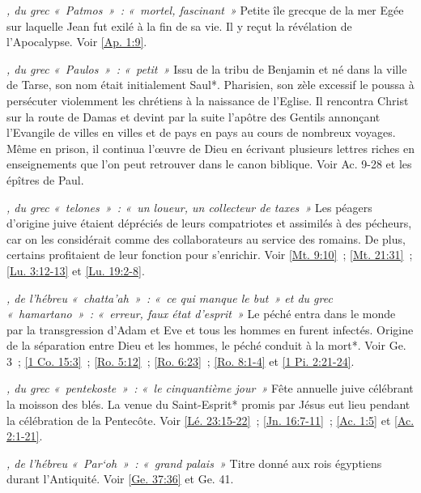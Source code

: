 \begin{multicols}{2}
\textit{, du grec «~Patmos~»~: «~mortel, fascinant~»}\newline
Petite île grecque de la mer Egée sur laquelle Jean fut exilé à la fin de sa vie. Il y reçut la révélation de l'Apocalypse. Voir \vref{Ap. 1:9}.

\textit{, du grec «~Paulos~»~: «~petit~»}\newline
Issu de la tribu de Benjamin et né dans la ville de Tarse, son nom était initialement Saul*. Pharisien, son zèle excessif le poussa à persécuter violemment les chrétiens à la naissance de l'Eglise. Il rencontra Christ sur la route de Damas et devint par la suite l'apôtre des Gentils annonçant l'Evangile de villes en villes et de pays en pays au cours de nombreux voyages. Même en prison, il continua l'œuvre de Dieu en écrivant plusieurs lettres riches en enseignements que l'on peut retrouver dans le canon biblique. Voir Ac. 9-28 et les épîtres de Paul.

\textit{, du grec «~telones~»~: «~un loueur, un collecteur de taxes~»}\newline
Les péagers d'origine juive étaient dépréciés de leurs compatriotes et assimilés à des pécheurs, car on les considérait comme des collaborateurs au service des romains. De plus, certains profitaient de leur fonction pour s'enrichir. Voir \vref{Mt. 9:10}~; \vref{Mt. 21:31}~; \vref{Lu. 3:12-13} et \vref{Lu. 19:2-8}.

\textit{, de l'hébreu «~chatta'ah~»~: «~ce qui manque le but~» et du grec «~hamartano~»~: «~erreur, faux état d'esprit~»}\newline
Le péché entra dans le monde par la transgression d'Adam et Eve et tous les hommes en furent infectés. Origine de la séparation entre Dieu et les hommes, le péché conduit à la mort*. Voir Ge. 3~; \vref{1 Co. 15:3}~; \vref{Ro. 5:12}~; \vref{Ro. 6:23}~; \vref{Ro. 8:1-4} et \vref{1 Pi. 2:21-24}.

\textit{, du grec «~pentekoste~»~: «~le cinquantième jour~»}\newline
Fête annuelle juive célébrant la moisson des blés. La venue du Saint-Esprit* promis par Jésus eut lieu pendant la célébration de la Pentecôte. Voir \vref{Lé. 23:15-22}~; \vref{Jn. 16:7-11}~; \vref{Ac. 1:5} et \vref{Ac. 2:1-21}.

\textit{, de l'hébreu «~Par`oh~»~: «~grand palais~»}\newline
Titre donné aux rois égyptiens durant l'Antiquité. Voir \vref{Ge. 37:36} et Ge. 41.


\end{multicols}
